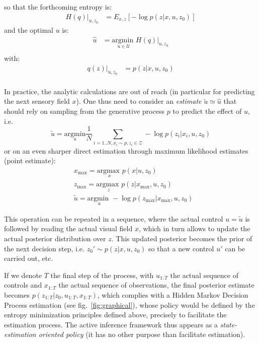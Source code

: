 \documentclass{article} %
\begin{document}
	
	so that the forthcoming entropy is:
	\begin{align*}
	H(q)|_{u, z_0} &=  E_{x,z}\left[-\log  p(z|x,u,z_0)\right]
	\end{align*}
	and the optimal $u$ is:
	\begin{align*}
	\hat{u} &= \underset{u \in \mathcal{U}}{\text{argmin }} H(q)|_{u, z_0} \\
	\end{align*}
	with:
	\begin{align*}
	q(z)|_{u,z_0} &= p(z|x,u,z_0) \\
	\end{align*}
	
	In practice, the analytic calculations are out of reach (in particular for predicting the next sensory field $x$).  One thus need to consider an \emph{estimate} $\tilde{u} \simeq \hat{u}$ that should rely on sampling from the generative process $p$ to 
	predict the effect of $u$,  i.e. 
	$$ \tilde{u} = \underset{u}{\text{argmin}} \frac{1}{N} \sum_{i = 1..N, x_i \sim p, z_i \in \mathcal{Z}} -\log p(z_i| x_i, u, z_0) $$ or on an even sharper direct estimation through maximum likelihood estimates (point estimate):
	\begin{align*}
	&x_\text{max} = \underset{x}{\text{argmax }} p(x|u,z_0)\\	
	&z_\text{max} = \underset{z}{\text{argmax }} p(z|x_\text{max}, u, z_0)\\
	&\tilde{u} = \underset{u}{\text{argmin }} - \log p(z_\text{max}|x_\text{max}, u, z_0)	
	\end{align*}


This operation can be repeated in a sequence, where the actual control $u = \tilde{u}$ is followed by reading the actual visual field $x$, which in turn allows to update the actual posterior distribution over $z$. This updated posterior becomes the prior of the next decision step, i.e. $z_0'\sim  p(z|x, u, z_0)$ so that a new control $u'$ can be carried out, etc. 

If we denote $T$ the final step of the process,  with $u_{1:T}$ the actual sequence of controls and $x_{1:T}$ the actual sequence of observations, the final posterior estimate becomes $p(z_{1:T}|z_0, u_{1:T}, x_{1:T})$, which complies with a Hidden Markov Decision Process estimation (see fig.~\ref{fig:graphical}), whose policy would be defined by the entropy minimization principles defined above, precisely to facilitate the estimation process. The active inference framework thus appears  as a \emph{state-estimation oriented policy} (it has no other purpose than facilitate estimation).
\end{document}
